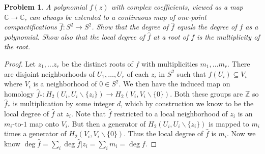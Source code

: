 \documentclass{article}
\newtheorem{problem}{Problem}
\begin{document}
\begin{problem}
A polynomial $f(z)$ with complex coefficients, viewed as a map $\mathbb{C} \to \mathbb{C}$, can always be extended to a continuous map of one-point compactifications $\hat{f} : S^2 \to S^2$. Show that the degree of $\hat{f}$ equals the degree of $f$ as a polynomial. Show also that the local degree of $\hat{f}$ at a root of $f$ is the multiplicity of the root.
\end{problem}
\begin{proof}
Let $z_1, \dots z_r$ be the distinct roots of $f$ with multiplicities $m_1, \dots m_r$. There are disjoint neighborhoods of $U_1, \dots , U_r$ of each $z_i$ in $S^2$ such that $f(U_i) \subseteq V_i$ where $V_i$ is a neighborhood of $0 \in S^2$. We then have the induced map on homology $\hat{f}_* : H_2(U_i,U_i \backslash \{z_i\}) \to H_2(V_i, V_i \backslash \{0\})$. Both these groups are $\mathbb{Z}$ so $\hat{f}_*$ is multiplication by some integer $d$, which by construction we know to be the local degree of $\hat{f}$ at $z_i$. Note that $\hat{f}$ restricted to a local neighborhood of $z_i$ is an $m_i$-to-$1$ map onto $V_i$. But then a generator of $H_2(U_i, U_i \backslash \{z_i\})$ is mapped to $m_i$ times a generator of $H_2(V_i, V_i \backslash \{0\})$. Thus the local degree of $\hat{f}$ is $m_i$. Now we know $\deg \hat{f} = \sum_i \deg \hat{f} | z_i = \sum_i m_i = \deg f$.
\end{proof}
\end{document}
